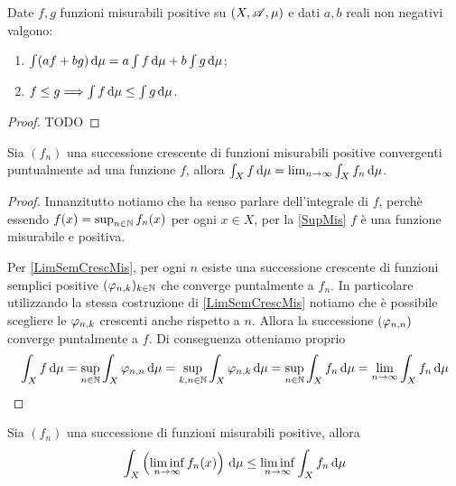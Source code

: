 \begin{proposition}\label{PropIntPos}
	Date $f,g$ funzioni misurabili positive su $(X,\mathscr A,\mu)$ e dati $a,b$ reali non negativi valgono:
	\begin{enumerate}
		\item $\int (af+bg)\,\mathrm d\mu=a\int f\,\mathrm d\mu+b\int g\,\mathrm d\mu$; \label{PIP:add}
		\item $f\le g\Longrightarrow \int f\,\mathrm d\mu\le \int g\,\mathrm d\mu$. \label{PIP:mono}
	\end{enumerate}
\end{proposition}
\begin{proof}
	TODO
\end{proof}

\begin{theorem}\label{BeppoLevi}
	Sia $(f_n)$ una successione crescente di funzioni misurabili positive convergenti puntualmente ad una funzione $f$, allora $\int_Xf\,\mathrm d\mu=\lim_{n\to\infty}\int_Xf_n\,\mathrm d\mu$.
\end{theorem}

\begin{proof}
	Innanzitutto notiamo che ha senso parlare dell'integrale di $f$, perchè essendo $f(x)=\sup_{n\in\mathbb N}f_n(x)$ per ogni $x\in X$, per la \cref{SupMis} $f$ è una funzione misurabile e positiva.
	
	Per \cref{LimSemCrescMis}, per ogni $n$ esiste una successione crescente di funzioni semplici positive $(\varphi_{n,k})_{k\in\mathbb N}$ che converge puntalmente a $f_n$. In particolare utilizzando la stessa costruzione di \cref{LimSemCrescMis} notiamo che è possibile scegliere le $\varphi_{n,k}$ crescenti anche rispetto a $n$. Allora la successione $(\varphi_{n,n})$ converge puntalmente a $f$. Di conseguenza otteniamo proprio
	\begin{equation*}
		\int_X f\,\mathrm d\mu=\sup_{n\in\mathbb N}\int_X\varphi_{n,n}\,\mathrm d\mu=\sup_{k,n\in\mathbb N}\int_X \varphi_{n,k}\,\mathrm d\mu=\sup_{n\in\mathbb N}\int_X f_n\,\mathrm d\mu=\lim_{n\to\infty}\int_Xf_n\,\mathrm d\mu
	\end{equation*}
\end{proof}


\begin{lemma}[Fatou]
	Sia $(f_n)$ una successione di funzioni misurabili positive, allora 
	\begin{equation*}
		\int_X\left(\liminf_{n\to\infty}f_n(x)\right)\,\mathrm d\mu\le \liminf_{n\to\infty}\int_Xf_n\,\mathrm d\mu
	\end{equation*}
\end{lemma}

